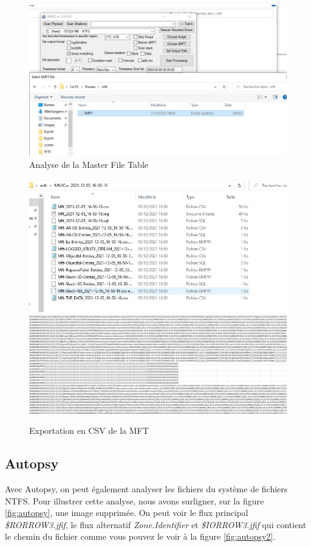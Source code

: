 \documentclass[a4paper]{article}
\begin{document}
\begin{figure}[H]
    \centering
    \includegraphics[width=0.59\linewidth]{images/mft1.jpg}
    \caption{Analyse de la Master File Table}
    \label{mft1}
\end{figure}

\begin{figure}[H]
    \centering
    \includegraphics[width=0.99\linewidth]{images/mft2.jpg}
    \includegraphics[width=0.99\linewidth]{images/mft3.jpg}
    \caption{Exportation en CSV de la MFT}
    \label{mft2}
\end{figure}


\subsection{Autopsy}

Avec Autopsy, on peut également analyser les fichiers du système de fichiers NTFS. Pour illustrer cette analyse, nous avons surligner, sur la figure \ref{fig:autopsy}, une image supprimée. On peut voir le flux principal \textit{\$RORROW3.jfif}, le flux alternatif \textit{Zone.Identifier} et \textit{\$IORROW3.jfif} qui contient le chemin du fichier comme vous pouvez le voir à la figure \ref{fig:autopsy2}.
\end{document}
